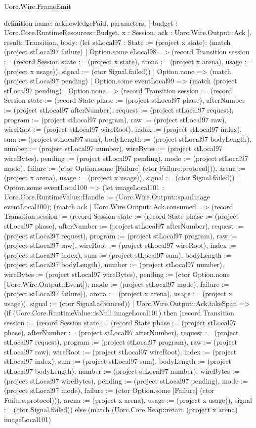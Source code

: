 \begin{lexlean}{Uorc.Wire.FrameEmit}
\begin{semanticmodule}
definition{
  name: acknowledgePaid,
  parameters: [
    budget : Uorc.Core.RuntimeResources::Budget,
    x : Session,
    ack : Uorc.Wire.Output::Ack
  ],
  result: Transition,
  body: (let stLocal97 : State := (project x state); (match (project stLocal97 failure)
    | Option.some eLocal98 => (record Transition {session := (record Session {state := (project x state), arena := (project x arena), usage := (project x usage)}), signal := (ctor Signal.failed)})
    | Option.none => (match (project stLocal97 pending)
      | Option.some eventLocal99 => (match (project stLocal97 pending)
        | Option.none => (record Transition {session := (record Session {state := (record State {phase := (project stLocal97 phase), afterNumber := (project stLocal97 afterNumber), request := (project stLocal97 request), program := (project stLocal97 program), raw := (project stLocal97 raw), wireRoot := (project stLocal97 wireRoot), index := (project stLocal97 index), sum := (project stLocal97 sum), bodyLength := (project stLocal97 bodyLength), number := (project stLocal97 number), wireBytes := (project stLocal97 wireBytes), pending := (project stLocal97 pending), mode := (project stLocal97 mode), failure := (ctor Option.some [Failure] (ctor Failure.protocol))}), arena := (project x arena), usage := (project x usage)}), signal := (ctor Signal.failed)})
        | Option.some eventLocal100 => (let imageLocal101 : Uorc.Core.RuntimeValue::Handle := (Uorc.Wire.Output::spanImage eventLocal100); (match ack
          | Uorc.Wire.Output::Ack.consumed => (record Transition {session := (record Session {state := (record State {phase := (project stLocal97 phase), afterNumber := (project stLocal97 afterNumber), request := (project stLocal97 request), program := (project stLocal97 program), raw := (project stLocal97 raw), wireRoot := (project stLocal97 wireRoot), index := (project stLocal97 index), sum := (project stLocal97 sum), bodyLength := (project stLocal97 bodyLength), number := (project stLocal97 number), wireBytes := (project stLocal97 wireBytes), pending := (ctor Option.none [Uorc.Wire.Output::Event]), mode := (project stLocal97 mode), failure := (project stLocal97 failure)}), arena := (project x arena), usage := (project x usage)}), signal := (ctor Signal.advanced)})
          | Uorc.Wire.Output::Ack.takeSpan => (if (Uorc.Core.RuntimeValue::isNull imageLocal101) then (record Transition {session := (record Session {state := (record State {phase := (project stLocal97 phase), afterNumber := (project stLocal97 afterNumber), request := (project stLocal97 request), program := (project stLocal97 program), raw := (project stLocal97 raw), wireRoot := (project stLocal97 wireRoot), index := (project stLocal97 index), sum := (project stLocal97 sum), bodyLength := (project stLocal97 bodyLength), number := (project stLocal97 number), wireBytes := (project stLocal97 wireBytes), pending := (project stLocal97 pending), mode := (project stLocal97 mode), failure := (ctor Option.some [Failure] (ctor Failure.protocol))}), arena := (project x arena), usage := (project x usage)}), signal := (ctor Signal.failed)}) else (match (Uorc.Core.Heap::retain (project x arena) imageLocal101)
}
\end{semanticmodule}
\end{lexlean}
